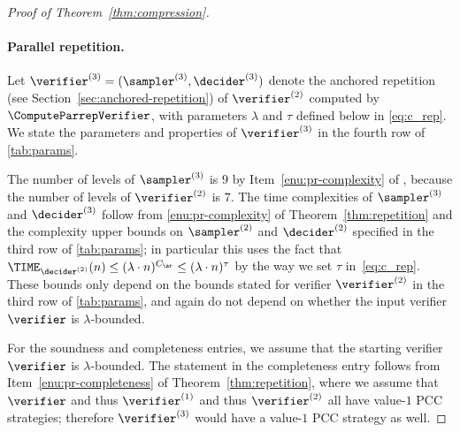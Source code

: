 \begin{proof}[Proof of Theorem~\ref{thm:compression}]
  \paragraph{Parallel repetition.}
  Let $\verifier^{(3)} = (\sampler^{(3)},\decider^{(3)})$ denote the anchored
  repetition (see Section~\ref{sec:anchored-repetition}) of $\verifier^{(2)}$
  computed by $\ComputeParrepVerifier$, with parameters $\lambda$ and $\tau$ defined below in \cref{eq:c_rep}. 
  We state the parameters and properties of $\verifier^{(3)}$ in the fourth row
  of \cref{tab:params}. 
  
  The number of levels of $\sampler^{(3)}$ is $9$ by Item~\ref{enu:pr-complexity} of , because the number of levels of $\verifier^{(2)}$ is $7$. The time complexities of $\sampler^{(3)}$ and $\decider^{(3)}$ follow from
  \cref{enu:pr-complexity} of Theorem~\ref{thm:repetition} and the
  complexity upper bounds on $\sampler^{(2)}$ and $\decider^{(2)}$ specified in
  the third row of \cref{tab:params}; in particular this uses the fact that $\TIME_{\decider^{(2)}}(n) \leq (\lambda \cdot n)^{C_\ar} \leq (\lambda \cdot n)^{\tau}$ by the way we set $\tau$ in~\cref{eq:c_rep}. 
  These bounds only depend on the bounds stated for verifier $\verifier^{(2)}$
  in the third row of \cref{tab:params}, and again do not depend on whether the
  input verifier $\verifier$ is $\lambda$-bounded.

  For the soundness and completeness entries, we assume that the starting verifier $\verifier$ is $\lambda$-bounded. The statement in the completeness entry follows from
  Item~\ref{enu:pr-completeness} of Theorem~\ref{thm:repetition}, where we assume that $\verifier$ and thus $\verifier^{(1)}$ and thus $\verifier^{(2)}$ all have value-$1$ PCC strategies; therefore $\verifier^{(3)}$ would have a value-$1$ PCC strategy as well.
  

\end{proof}
